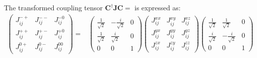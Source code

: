 \documentclass[aps, prx, nofootinbib, superscriptaddress]{revtex4-2}
\begin{document}
The transformed coupling tensor $\mathbf{C}^{\dagger} \mathbf{J} \mathbf{C} = $ is expressed as:
\begin{equation}
    \begin{split}
    \begin{pmatrix}
        J^{-+}_{ij} & J^{--}_{ij} & J^{-0}_{ij} \\[0.3em]
        J^{++}_{ij} & J^{+-}_{ij} & J^{+0}_{ij} \\[0.3em]
        J^{0+}_{ij} & J^{0-}_{ij} & J^{00}_{ij}
    \end{pmatrix}
    = &
    \begin{pmatrix}
        \frac{1}{\sqrt{2}}   & - \frac{i}{\sqrt{2}}   &   0   \\[0.3em]
        \frac{1}{\sqrt{2}}   &   \frac{i}{\sqrt{2}}   &   0   \\[0.3em]
                0     &         0       &   1   
    \end{pmatrix} 
    \begin{pmatrix}
        J^{xx}_{ij}   &   J^{xy}_{ij}   &   J^{xz}_{ij}   \\[0.3em]
        J^{yx}_{ij}   &   J^{yy}_{ij}   &   J^{yz}_{ij}   \\[0.3em]
        J^{zx}_{ij}   &   J^{zy}_{ij}   &   J^{zz}_{ij}   
    \end{pmatrix}
    \begin{pmatrix}
        \frac{1}{\sqrt{2}}   &   \frac{1}{\sqrt{2}}   &   0   \\[0.3em]
        \frac{i}{\sqrt{2}}   & - \frac{i}{\sqrt{2}}   &   0   \\[0.3em]
                0     &         0       &   1   
    \end{pmatrix} 
    \end{split}
\end{equation}
\end{document}
